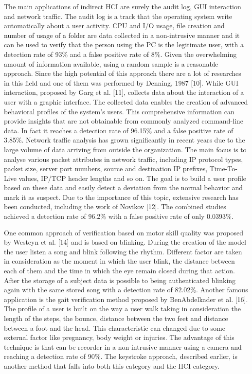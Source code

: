 \documentclass{article}
\begin{document}
The main applications of indirect HCI are surely the audit log, GUI interaction and network traffic.
The audit log is a track that the operating system write automatically about a user activity.
CPU and I/O usage, file creation and number of usage of a folder are data collected in a non-intrusive manner and it can be used to verify that the person using the PC is the legitimate user, with a detection rate of 93\% and a false positive rate of 8\%.
Given the overwhelming amount of information available, using a random sample is a reasonable approach.
Since the high potential of this approach there are a lot of researches in this field and one of them was performed by Denning, 1987 [10].
While GUI interaction, proposed by  Garg et al. [11], collects data about the interaction of a user with a graphic interface.
The collected data enables the creation of advanced behavioral profiles of the system's users. 
This comprehensive information can provide insights that are not obtainable from commonly analyzed command-line data.
In fact it reaches a detection rate of 96.15\% and a false positive rate of 3.85\%.
Network traffic analysis has grown significantly in recent years due to the large volume of data arriving from outside the organization. 
The main focus is to analyse various packet attributes in network traffic, including IP protocol types, packet size, server port numbers, source and destination IP prefixes, Time-To-Live values, IP/TCP header lengths and so on. 
The goal is to build a user profile based on these data and easily detect a deviation from the normal behavior and mark it as suspect.
Due to the importance of this topic, extensive research has been conducted, including the work of Novikov [12]. 
The combined studies achieved a detection rate of 96.2\% with a false positive rate of only 0.0393\%.

One common approach of verification based on motor skill quality was proposed by Westeyn et al. [14] and is based on blinking. 
During the creation of the model the user listen a song and blink following the rhythm. 
Different factor are taken in consideration as the moment in which the user blink, the distance between each of them and the time in which the eye remain closed during that action. 
After the storage of a subject data is possible to being authenticated blinking again with the same stored song with a detection rate of 82.02\%.
Another famous application is the gait verification method proposed by BenAbdelkader et al. [16].
The profile of a user is built on the way a user walk taking in consideration the length of the steps, the bounce, distance between the two feet and distance between a foot and the head. 
This characteristic can changed due to some external factor like pregnancy, body weight or injuries. 
The advantage of this technique is that can be recorder in a non-intrusive manner using a camera and reaching a detection rate of 90\%.
The keystroke approach, described earlier, is another method that falls into both this category and the HCI category.
\end{document}
